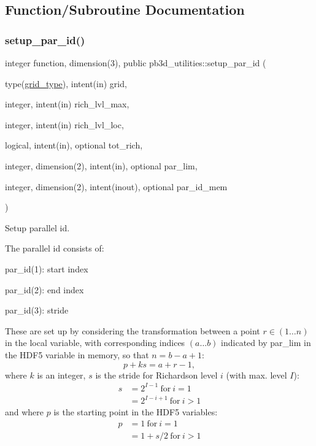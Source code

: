 \subsection{Function/\+Subroutine Documentation}
\mbox{\label{namespacepb3d__utilities_ad047cd7b197aae821e2565933faccfa3}} 
\subsubsection{\texorpdfstring{setup\+\_\+par\+\_\+id()}{setup\_par\_id()}}
{\footnotesize\ttfamily integer function, dimension(3), public pb3d\+\_\+utilities\+::setup\+\_\+par\+\_\+id (\begin{DoxyParamCaption}\item[{type(\hyperlink{structgrid__vars_1_1grid__type}{grid\+\_\+type}), intent(in)}]{grid,  }\item[{integer, intent(in)}]{rich\+\_\+lvl\+\_\+max,  }\item[{integer, intent(in)}]{rich\+\_\+lvl\+\_\+loc,  }\item[{logical, intent(in), optional}]{tot\+\_\+rich,  }\item[{integer, dimension(2), intent(in), optional}]{par\+\_\+lim,  }\item[{integer, dimension(2), intent(inout), optional}]{par\+\_\+id\+\_\+mem }\end{DoxyParamCaption})}



Setup parallel id. 

The parallel id consists of\+:
\begin{DoxyItemize}
\item {\ttfamily par\+\_\+id(1)}\+: start index
\item {\ttfamily par\+\_\+id(2)}\+: end index
\item {\ttfamily par\+\_\+id(3)}\+: stride
\end{DoxyItemize}

These are set up by considering the transformation between a point $r \in (1\ldots n)$ in the local variable, with corresponding indices $(a\ldots b)$ indicated by {\ttfamily par\+\_\+lim} in the H\+D\+F5 variable in memory, so that $n = b-a+1$\+: \[p + k s = a + r - 1,\] where $k$ is an integer, $s$ is the stride for Richardson level $i$ (with max. level $I$)\+: \[\begin{aligned} s &= 2^{I-1} \ \text{for} \ i = 1 \\ &= 2^{I-i+1} \ \text{for} \ i > 1 \end{aligned}\] and where $p$ is the starting point in the H\+D\+F5 variables\+: \[\begin{aligned} p &= 1 \ \text{for} \ i = 1 \\ &= 1 + s/2 \ \text{for} \ i > 1 \end{aligned}\]

